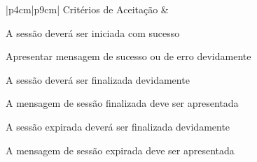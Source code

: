 \begin{tabela}{|p{4cm}|p{9cm}|}
    \hline
    Critérios de Aceitação &
    \begin{enumalfa}{0.6}
        \item A sessão deverá ser iniciada com sucesso
        \item Apresentar mensagem de sucesso ou de erro devidamente
        \item A sessão deverá ser finalizada devidamente
        \item A mensagem de sessão finalizada deve ser apresentada
        \item A sessão expirada deverá ser finalizada devidamente
        \item A mensagem de sessão expirada deve ser apresentada
    \end{enumalfa}\\
    \hline
\end{tabela}

